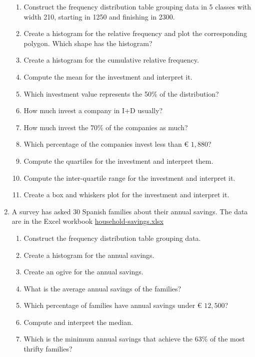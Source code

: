 \begin{enumerate}[leftmargin=*,resume]
\begin{enumerate}
\item Construct the frequency distribution table grouping data in 5 classes with width 210, starting in 1250 and
finishing in 2300.
\item Create a histogram for the relative frequency and plot the corresponding polygon.  
Which shape has the histogram?
\item Create a histogram for the cumulative relative frequency. 
\item Compute the mean for the investment and interpret it. 
\item Which investment value represents the 50\% of the distribution?
\item How much invest a company in I+D usually?
\item How much invest the 70\% of the companies as much?
\item Which percentage of the companies invest less than € $1,880$?
\item Compute the quartiles for the investment and interpret them. 
\item Compute the inter-quartile range for the investment and interpret it. 
\item Create a box and whiskers plot for the investment and interpret it. 
\end{enumerate}


\item A survey has asked 30 Spanish families about their annual savings. 
The data are in the Excel workbook
\href{http://aprendeconalf.es/office/excel/exercises/descriptive-statistics/household-savings.xlsx}{\textsf{household-savings.xlsx}}
\begin{enumerate}
\item Construct the frequency distribution table grouping data. 
\item Create a histogram for the annual savings. 
\item Create an ogive for the annual savings. 
\item What is the average annual savings of the families?
\item Which percentage of families have annual savings under € $12,500$?
\item Compute and interpret the median. 
\item Which is the minimum annual savings that achieve the 63\% of the most thrifty families?
\end{enumerate}






\end{enumerate}
